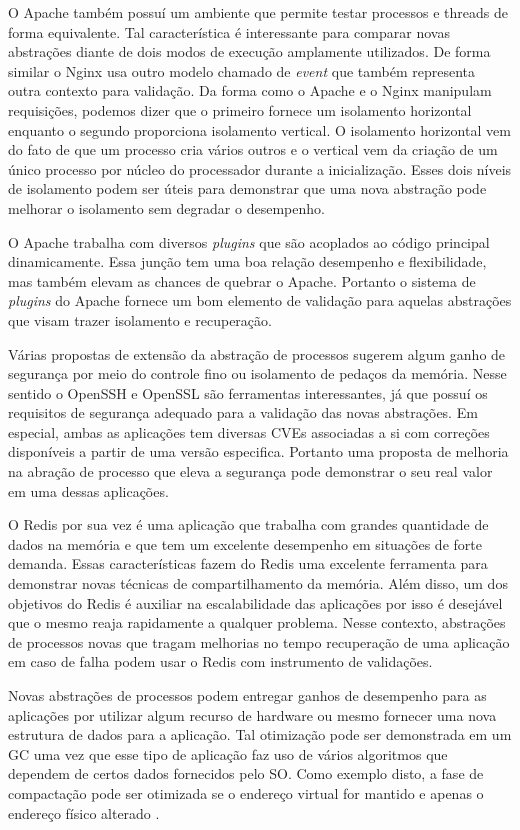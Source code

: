 O Apache também possuí um ambiente que permite testar processos e threads de
forma equivalente. Tal característica é interessante para comparar novas
abstrações diante de dois modos de execução amplamente utilizados. De forma
similar o Nginx usa outro modelo chamado de \textit{event} que também
representa outra contexto para validação. Da forma como o Apache e o Nginx
manipulam requisições, podemos dizer que o primeiro fornece um isolamento
horizontal enquanto o segundo proporciona isolamento vertical. O isolamento
horizontal vem do fato de que um processo cria vários outros e o vertical vem
da criação de um único processo por núcleo do processador durante a
inicialização. Esses dois níveis de isolamento podem ser úteis para demonstrar
que uma nova abstração pode melhorar o isolamento sem degradar o desempenho.

O Apache trabalha com diversos \textit{plugins} que são acoplados ao código
principal dinamicamente. Essa junção tem uma boa relação desempenho e
flexibilidade, mas também elevam as chances de quebrar o Apache.  Portanto o
sistema de \textit{plugins} do Apache fornece um bom elemento de validação para
aquelas abstrações que visam trazer isolamento e recuperação.

Várias propostas de extensão da abstração de processos sugerem algum ganho de
segurança por meio do controle fino ou isolamento de pedaços da memória. Nesse
sentido o OpenSSH e OpenSSL são ferramentas interessantes, já que possuí os
requisitos de segurança adequado para a validação das novas abstrações. Em
especial, ambas as aplicações tem diversas CVEs associadas a si com correções
disponíveis a partir de uma versão especifica. Portanto uma proposta de
melhoria na abração de processo que eleva a segurança pode demonstrar o seu
real valor em uma dessas aplicações.

O Redis por sua vez é uma aplicação que trabalha com grandes quantidade de
dados na memória e que tem um excelente desempenho em situações de forte
demanda. Essas características fazem do Redis uma excelente ferramenta para
demonstrar novas técnicas de compartilhamento da memória. Além disso, um dos
objetivos do Redis é auxiliar na escalabilidade das aplicações por isso é
desejável que o mesmo reaja rapidamente a qualquer problema. Nesse contexto,
abstrações de processos novas que tragam melhorias no tempo recuperação de uma
aplicação em caso de falha podem usar o Redis com instrumento de validações.

Novas abstrações de processos podem entregar ganhos de desempenho para as
aplicações por utilizar algum recurso de hardware ou mesmo fornecer uma nova
estrutura de dados para a aplicação. Tal otimização pode ser demonstrada em um
GC uma vez que esse tipo de aplicação faz uso de vários algoritmos que dependem
de certos dados fornecidos pelo SO. Como exemplo disto, a fase de compactação
pode ser otimizada se o endereço virtual for mantido e apenas o endereço físico
alterado \citep{pauseless}.


